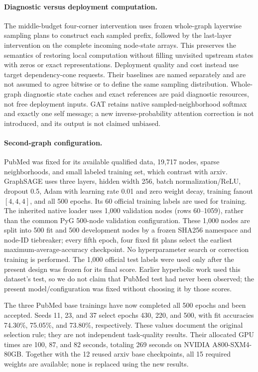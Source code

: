 \begingroup\small\setlength{\tabcolsep}{3pt}

\endgroup

\paragraph{Diagnostic versus deployment computation.}
The middle-budget four-corner intervention uses frozen whole-graph layerwise sampling plans to construct each sampled prefix, followed by the last-layer intervention on the complete incoming node-state arrays. This preserves the semantics of restoring local computation without filling unvisited upstream states with zeros or exact representations. Deployment quality and cost instead use target dependency-cone requests. Their baselines are named separately and are not assumed to agree bitwise or to define the same sampling distribution. Whole-graph diagnostic state caches and exact references are paid diagnostic resources, not free deployment inputs. GAT retains native sampled-neighborhood softmax and exactly one self message; a new inverse-probability attention correction is not introduced, and its output is not claimed unbiased.

\paragraph{Second-graph configuration.}
PubMed was fixed for its available qualified data, 19,717 nodes, sparse neighborhoods, and small labeled training set, which contrast with arxiv. GraphSAGE uses three layers, hidden width 256, batch normalization/ReLU, dropout 0.5, Adam with learning rate 0.01 and zero weight decay, training fanout $[4,4,4]$, and all 500 epochs. Its 60 official training labels are used for training. The inherited native loader uses 1,000 validation nodes (rows 60--1059), rather than the common PyG 500-node validation configuration. These 1,000 nodes are split into 500 fit and 500 development nodes by a frozen SHA256 namespace and node-ID tiebreaker; every fifth epoch, four fixed fit plans select the earliest maximum-average-accuracy checkpoint. No hyperparameter search or correction training is performed. The 1,000 official test labels were used only after the present design was frozen for its final score. Earlier hyperbolic work used this dataset's test, so we do not claim that PubMed test had never been observed; the present model/configuration was fixed without choosing it by those scores.

The three PubMed base trainings have now completed all 500 epochs and been accepted. Seeds 11, 23, and 37 select epochs 430, 220, and 500, with fit accuracies 74.30\%, 75.05\%, and 73.80\%, respectively. These values document the original selection rule; they are not independent task-quality results. Their allocated GPU times are 100, 87, and 82 seconds, totaling 269 seconds on NVIDIA A800-SXM4-80GB. Together with the 12 reused arxiv base checkpoints, all 15 required weights are available; none is replaced using the new results.

